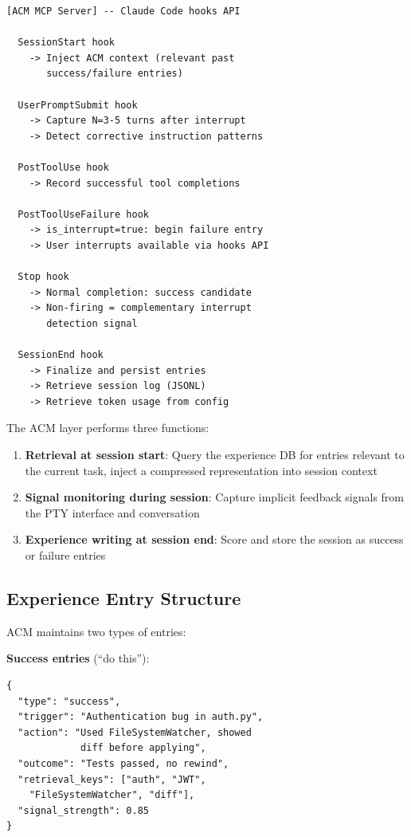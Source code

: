 \documentclass[conference]{IEEEtran}
\begin{document}
\begin{lstlisting}[caption={ACM MCP Server hook architecture},label={lst:hooks}]
[ACM MCP Server] -- Claude Code hooks API

  SessionStart hook
    -> Inject ACM context (relevant past
       success/failure entries)

  UserPromptSubmit hook
    -> Capture N=3-5 turns after interrupt
    -> Detect corrective instruction patterns

  PostToolUse hook
    -> Record successful tool completions

  PostToolUseFailure hook
    -> is_interrupt=true: begin failure entry
    -> User interrupts available via hooks API

  Stop hook
    -> Normal completion: success candidate
    -> Non-firing = complementary interrupt
       detection signal

  SessionEnd hook
    -> Finalize and persist entries
    -> Retrieve session log (JSONL)
    -> Retrieve token usage from config
\end{lstlisting}

The ACM layer performs three functions:

\begin{enumerate}
\item \textbf{Retrieval at session start}: Query the experience DB for entries relevant to the current task, inject a compressed representation into session context
\item \textbf{Signal monitoring during session}: Capture implicit feedback signals from the PTY interface and conversation
\item \textbf{Experience writing at session end}: Score and store the session as success or failure entries
\end{enumerate}

\subsection{Experience Entry Structure}

ACM maintains two types of entries:

\textbf{Success entries} (``do this''):
\begin{lstlisting}
{
  "type": "success",
  "trigger": "Authentication bug in auth.py",
  "action": "Used FileSystemWatcher, showed
             diff before applying",
  "outcome": "Tests passed, no rewind",
  "retrieval_keys": ["auth", "JWT",
    "FileSystemWatcher", "diff"],
  "signal_strength": 0.85
}
\end{lstlisting}
\end{document}
